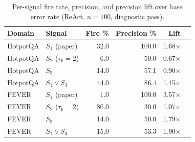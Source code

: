 \begin{table}[t]
\caption{Per-signal fire rate, precision, and precision lift over base
error rate (ReAct, $n{=}100$, diagnostic pass).}
\label{tab:signals}
\centering\small
\begin{tabular}{@{}llrrrr@{}}
\toprule
Domain & Signal & Fire \% & Precision \% & Lift \\
\midrule
HotpotQA & $S_1$ (paper) & 32.0 & 100.0 & 1.68$\times$ \\
HotpotQA & $S_2$ ($\tau_0{=}2$) & 6.0 & 50.0 & 0.67$\times$ \\
HotpotQA & $S_3$ & 14.0 & 57.1 & 0.90$\times$ \\
HotpotQA & $S_1 \lor S_3$ & 44.0 & 86.4 & 1.45$\times$ \\
\addlinespace
FEVER & $S_1$ (paper) & 1.0 & 100.0 & 3.57$\times$ \\
FEVER & $S_2$ ($\tau_0{=}2$) & 80.0 & 30.0 & 1.07$\times$ \\
FEVER & $S_3$ & 14.0 & 50.0 & 1.79$\times$ \\
FEVER & $S_1 \lor S_3$ & 15.0 & 53.3 & 1.90$\times$ \\
\bottomrule
\end{tabular}
\end{table}
